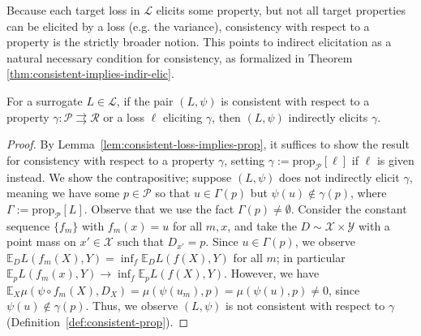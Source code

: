 \documentclass[anon,12pt]{colt2021} %
\newcommand{\Comments}{1}
\newcommand{\mynote}[2]{\ifnum\Comments=1\textcolor{#1}{#2}\fi}
\newcommand{\mytodo}[2]{\ifnum\Comments=1%
	\todo[linecolor=#1!80!black,backgroundcolor=#1,bordercolor=#1!80!black]{#2}\fi}
\newcommand{\raft}[1]{\mytodo{green!20!white}{RF: #1}}
\newcommand{\jessie}[1]{\mynote{purple}{[JF: #1]}}
\newcommand{\jessiet}[1]{\mytodo{purple!20!white}{JF: #1}}
\newcommand{\prop}[2][\mathcal{P}]{\mathrm{prop}_{#1}[#2]}
\newcommand{\propdis}{\mu}
\newcommand{\D}{\mathcal{D}}
\newcommand{\E}{\mathbb{E}}
\renewcommand{\L}{\mathcal{L}}
\newcommand{\R}{\mathcal{R}}
\renewcommand{\P}{\mathcal{P}}
\newcommand{\X}{\mathcal{X}}
\newcommand{\Y}{\mathcal{Y}}
\newcommand{\toto}{\rightrightarrows}
\begin{document}
Because each target loss in $\L$ elicits some property, but not all target properties can be elicited by a loss (e.g. the variance), consistency with respect to a property is the strictly broader notion.
This points to indirect elicitation as a natural necessary condition for consistency, as formalized in Theorem \ref{thm:consistent-implies-indir-elic}.


\begin{theorem}\label{thm:consistent-implies-indir-elic}
	For a surrogate $L \in \L$, if the pair $(L, \psi)$ is consistent with respect to a property $\gamma: \P \toto \R$ or a loss $\ell$ eliciting $\gamma$, then $(L, \psi)$ indirectly elicits $\gamma$.
\end{theorem}
\begin{proof}
	By Lemma~\ref{lem:consistent-loss-implies-prop}, it suffices to show the result for consistency with respect to a property $\gamma$, setting $\gamma := \prop{\ell}$ if $\ell$ is given instead.
	We show the contrapositive; suppose $(L, \psi)$ does not indirectly elicit $\gamma$, meaning we have some $p \in \P$ so that $u \in \Gamma(p)$ but $\psi(u) \not \in \gamma(p)$, where $\Gamma := \prop{L}$.
	Observe that we use the fact $\Gamma(p) \neq \emptyset$.
	Consider the constant sequence $\{f_m\}$ with $f_m(x) = u$ for all $m,x$, and take the $D\sim \X \times\Y$ with a point mass on $x' \in \X$ such that $D_{x'} = p$.
  Since $u \in \Gamma(p)$, we observe $\E_D L(f_m(X), Y) = \inf_f \E_D L(f(X),Y)$ for all $m$; in particular $\E_p L(f_m(x), Y) \to \inf_f \E_p L(f(X),Y)$.
	However, we have $\E_X \propdis(\psi \circ f_m(X), D_X) = \propdis(\psi(u_m), p) = \propdis(\psi(u), p) \neq 0$, since $\psi(u) \not \in \gamma(p)$.
	Thus, we observe $(L, \psi)$ is not consistent with respect to $\gamma$ (Definition~\ref{def:consistent-prop}).
\end{proof}
\end{document}
